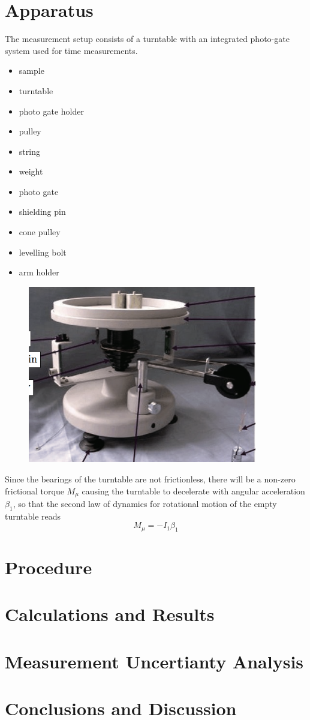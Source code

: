 \documentclass[12pt,a4paper]{article}
\begin{document}
\section{Apparatus}
The measurement setup consists of a turntable with an integrated photo-gate
system used for time measurements.
\singlespacing
\begin{itemize}
\item sample
\item turntable
\item photo gate holder
\item pulley
\item string
\item weight
\item photo gate
\item shielding pin
\item cone pulley
\item levelling bolt
\item arm holder
\end{itemize}
\doublespacing

\begin{figure}[H]
\centering
\includegraphics[width=10cm]{fig/app/turntable}
\end{figure}

Since the bearings of the turntable are not frictionless, there will be a
non-zero frictional torque $M_μ$ causing the turntable to decelerate with
angular acceleration $\beta_1$, so that the second law of dynamics for
rotational motion of the empty turntable reads $$   M_\mu = -I_1\beta_1  $$
\section{Procedure}

\section{Calculations and Results}

\section{Measurement Uncertianty Analysis}

\section{Conclusions and Discussion}

\end{document}
